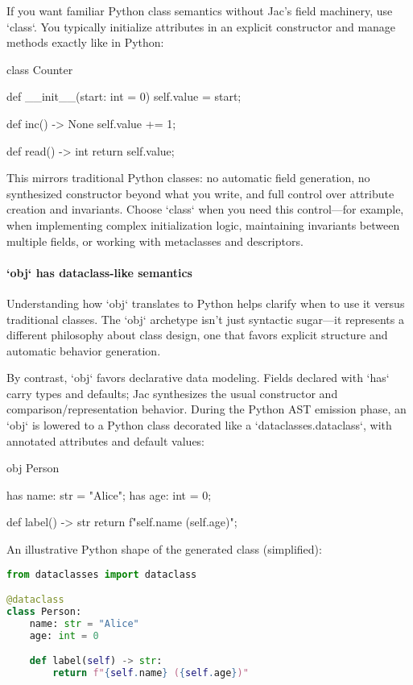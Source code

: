 If you want familiar Python class semantics without Jac's field machinery, use `class`. You typically initialize attributes in an explicit constructor and manage methods exactly like in Python:

\begin{jacblock}
class Counter {
    def __init__(start: int = 0) {
        self.value = start;
    }

    def inc() -> None { self.value += 1; }

    def read() -> int { return self.value; }
}
\end{jacblock}

This mirrors traditional Python classes: no automatic field generation, no synthesized constructor beyond what you write, and full control over attribute creation and invariants. Choose `class` when you need this control—for example, when implementing complex initialization logic, maintaining invariants between multiple fields, or working with metaclasses and descriptors.

\paragraph{`obj` has dataclass-like semantics}

Understanding how `obj` translates to Python helps clarify when to use it versus traditional classes. The `obj` archetype isn't just syntactic sugar—it represents a different philosophy about class design, one that favors explicit structure and automatic behavior generation.

By contrast, `obj` favors declarative data modeling. Fields declared with `has` carry types and defaults; Jac synthesizes the usual constructor and comparison/representation behavior. During the Python AST emission phase, an `obj` is lowered to a Python class decorated like a `dataclasses.dataclass`, with annotated attributes and default values:

\begin{jacblock}
obj Person {
    has name: str = "Alice";
    has age: int = 0;

    def label() -> str { return f"{self.name} ({self.age})"; }
}
\end{jacblock}

An illustrative Python shape of the generated class (simplified):

\begin{lstlisting}[language=Python]
from dataclasses import dataclass

@dataclass
class Person:
    name: str = "Alice"
    age: int = 0

    def label(self) -> str:
        return f"{self.name} ({self.age})"
\end{lstlisting}

